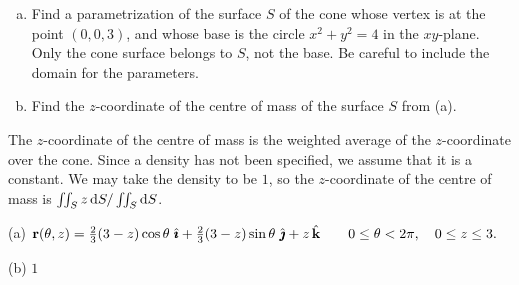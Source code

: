 \begin{question}[M317 2013D] %

\begin{enumerate}[(a)]
\item
Find a parametrization of the surface $S$ of the cone whose vertex is 
at the point $(0, 0, 3)$, and whose base is the circle $x^2 + y^2 = 4$ 
in the $xy$-plane. Only the cone surface belongs to $S$, not the base. 
Be careful to include the domain for the parameters.
\item
Find the $z$-coordinate of the centre of mass of the surface $S$ from (a).
\end{enumerate}
\end{question}

\begin{hint} 
The $z$-coordinate of the centre of mass is the weighted average of the
$z$-coordinate over the cone. Since a density has not been specified,
we assume that it is a constant. We may take the density to be $1$, so the
$z$-coordinate of the centre of mass is $\iint_S z\,\mathrm{d}S/
\iint_S \mathrm{d}S$.
\end{hint}

\begin{answer} 
(a) $\mathbf{r}(\theta,z) = \frac{2}{3}(3-z)\cos\theta\ \hat{\pmb{\imath}} 
                +\frac{2}{3}(3-z)\sin\theta\ \hat{\pmb{\jmath}}
                +z\,\hat{\mathbf{k}}\qquad
0\le\theta<2\pi,\quad 0\le z\le 3.$

\noindent (b) $1$

\end{answer}

